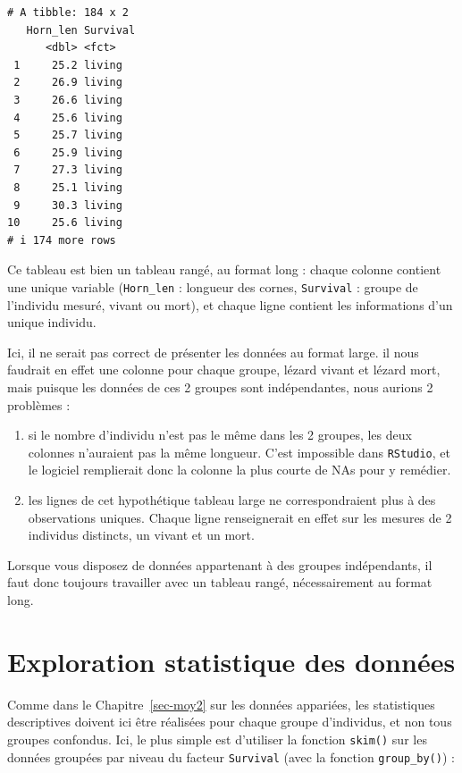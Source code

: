 \documentclass[
  a4paper,
  DIV=11,
  numbers=noendperiod,
  oneside]{scrreprt}
\providecommand{\tightlist}{%
  \setlength{\itemsep}{0pt}\setlength{\parskip}{0pt}}\usepackage{longtable,booktabs,array}
\begin{document}
\begin{verbatim}
# A tibble: 184 x 2
   Horn_len Survival
      <dbl> <fct>   
 1     25.2 living  
 2     26.9 living  
 3     26.6 living  
 4     25.6 living  
 5     25.7 living  
 6     25.9 living  
 7     27.3 living  
 8     25.1 living  
 9     30.3 living  
10     25.6 living  
# i 174 more rows
\end{verbatim}

Ce tableau est bien un tableau rangé, au format long : chaque colonne
contient une unique variable (\texttt{Horn\_len} : longueur des cornes,
\texttt{Survival} : groupe de l'individu mesuré, vivant ou mort), et
chaque ligne contient les informations d'un unique individu.

Ici, il ne serait pas correct de présenter les données au format large.
il nous faudrait en effet une colonne pour chaque groupe, lézard vivant
et lézard mort, mais puisque les données de ces 2 groupes sont
indépendantes, nous aurions 2 problèmes :

\begin{enumerate}
\def\labelenumi{\arabic{enumi}.}
\tightlist
\item
  si le nombre d'individu n'est pas le même dans les 2 groupes, les deux
  colonnes n'auraient pas la même longueur. C'est impossible dans
  \texttt{RStudio}, et le logiciel remplierait donc la colonne la plus
  courte de NAs pour y remédier.
\item
  les lignes de cet hypothétique tableau large ne correspondraient plus
  à des observations uniques. Chaque ligne renseignerait en effet sur
  les mesures de 2 individus distincts, un vivant et un mort.
\end{enumerate}

Lorsque vous disposez de données appartenant à des groupes indépendants,
il faut donc toujours travailler avec un tableau rangé, nécessairement
au format long.

\hypertarget{exploration-statistique-des-donnuxe9es-1}{%
\section{Exploration statistique des
données}\label{exploration-statistique-des-donnuxe9es-1}}

Comme dans le Chapitre~\ref{sec-moy2} sur les données appariées, les
statistiques descriptives doivent ici être réalisées pour chaque groupe
d'individus, et non tous groupes confondus. Ici, le plus simple est
d'utiliser la fonction \texttt{skim()} sur les données groupées par
niveau du facteur \texttt{Survival} (avec la fonction
\texttt{group\_by()}) :
\end{document}
